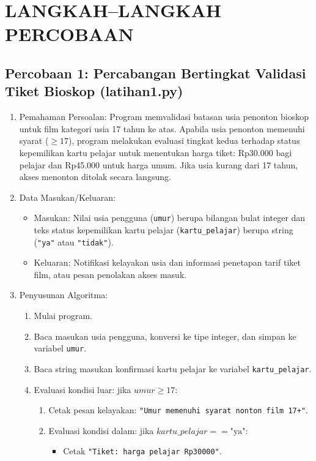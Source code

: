 \documentclass[12pt,a4paper]{article}
\begin{document}
\section{LANGKAH--LANGKAH PERCOBAAN}

\subsection{Percobaan 1: Percabangan Bertingkat Validasi Tiket Bioskop (latihan1.py)}
\begin{enumerate}
    \item Pemahaman Persoalan: Program memvalidasi batasan usia penonton bioskop untuk film kategori usia 17 tahun ke atas. Apabila usia penonton memenuhi syarat ($\ge 17$), program melakukan evaluasi tingkat kedua terhadap status kepemilikan kartu pelajar untuk menentukan harga tiket: Rp30.000 bagi pelajar dan Rp45.000 untuk harga umum. Jika usia kurang dari 17 tahun, akses menonton ditolak secara langsung.
    \item Data Masukan/Keluaran:
    \begin{itemize}
        \item Masukan: Nilai usia pengguna (\texttt{umur}) berupa bilangan bulat integer dan teks status kepemilikan kartu pelajar (\texttt{kartu\_pelajar}) berupa string (\texttt{"ya"} atau \texttt{"tidak"}).
        \item Keluaran: Notifikasi kelayakan usia dan informasi penetapan tarif tiket film, atau pesan penolakan akses masuk.
    \end{itemize}
    \item Penyusunan Algoritma:
    \begin{enumerate}[label=\alph*.]
        \item Mulai program.
        \item Baca masukan usia pengguna, konversi ke tipe integer, dan simpan ke variabel \texttt{umur}.
        \item Baca string masukan konfirmasi kartu pelajar ke variabel \texttt{kartu\_pelajar}.
        \item Evaluasi kondisi luar: jika $umur \ge 17$:
        \begin{enumerate}[label=\roman*.]
            \item Cetak pesan kelayakan: \texttt{"Umur memenuhi syarat nonton film 17+"}.
            \item Evaluasi kondisi dalam: jika $kartu\_pelajar == \text{"ya"}$:
            \begin{itemize}
                \item Cetak \texttt{"Tiket: harga pelajar Rp30000"}.

\end{itemize}
\end{enumerate}
\end{enumerate}
\end{enumerate}
\end{document}
